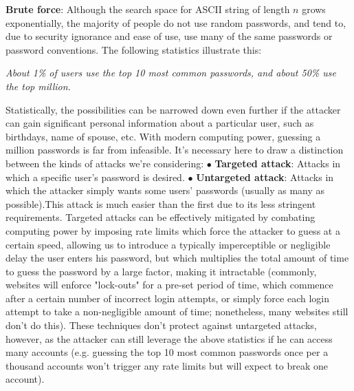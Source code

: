 \documentclass{article}
\begin{document}
\textbf{Brute force}: Although the search space for ASCII string of length $ n $ grows exponentially, the majority of people do not use random passwords, and tend to, due to security ignorance and ease of use, use many of the same passwords or password conventions. The following statistics illustrate this:
\begin{center}
\textit{About 1\% of users use the top 10 most common passwords, and about 50\% use the top million.}
\end{center}
\indent Statistically, the possibilities can be narrowed down even further if the attacker can gain significant personal information about a particular user, such as birthdays, name of spouse, etc. With modern computing power, guessing a million passwords is far from infeasible. It's necessary here to draw a distinction between the kinds of attacks we're considering:
\newline
\indent $ \bullet $ \textbf{Targeted attack}: Attacks in which a specific user's password is desired.
\newline
\indent $ \bullet $ \textbf{Untargeted attack}: Attacks in which the attacker simply wants some users' passwords (usually as many as possible).This attack is much easier than the first due to its less stringent requirements.
\newline
\indent Targeted attacks can be effectively mitigated by combating computing power by imposing rate limits which force the attacker to guess at a certain speed, allowing us to introduce a typically imperceptible or negligible delay the user enters his password, but which multiplies the total amount of time to guess the password by a large factor, making it intractable (commonly, websites will enforce "lock-outs" for a pre-set period of time, which commence after a certain number of incorrect login attempts, or simply force each login attempt to take a non-negligible amount of time; nonetheless, many websites still don't do this). These techniques don't protect against untargeted attacks, however, as the attacker can still leverage the above statistics if he can access many accounts (e.g. guessing the top 10 most common passwords once per a thousand accounts won't trigger any rate limits but will expect to break one account).
\newline \newline
\end{document}

